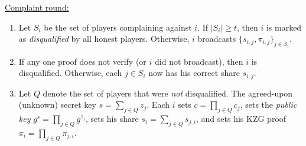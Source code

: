 {\begin{algorithm}[t]

        \underline{Complaint round:}
        \begin{enumerate}
            \item Let $S_i$ be the set of players complaining against $i$. If $|S_i| \ge t$, then $i$ is marked as \textit{disqualified} by all honest players.
                  Otherwise, $i$ broadcasts $\{s_{i,j},\pi_{i,j}\}_{j\in S_i}$.
            \item If any one proof does not verify (or $i$ did not broadcast), then $i$ is disqualified.
                  Otherwise, each $j\in S_i$ now has his correct share $s_{i,j}$.
            \item Let $Q$ denote the set of players that were \textit{not} disqualified.
                  The agreed-upon (unknown) secret key $s=\sum_{j \in Q} z_j$.
                  Each $i$
                sets $c = \prod_{j\in Q} c_j$,
                sets the \textit{public key} $g^s = \prod_{j\in Q} g^{z_j}$,
                sets his share $s_i = \sum_{j\in Q} s_{j,i}$,
                and sets his KZG proof $\pi_i = \prod_{j\in Q} \pi_{j,i}$.
        \end{enumerate}


\end{algorithm}}
